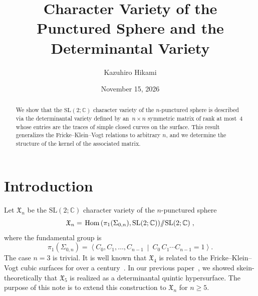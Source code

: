 \documentclass[12pt,reqno]{amsart}
\DeclareMathOperator{\Hom}{Hom}
\begin{document}
\title[]{Character Variety of the Punctured Sphere
  and
  the Determinantal Variety}
\author[]{Kazuhiro Hikami}
\address{Faculty of Mathematics,
  Kyushu University,
  Fukuoka 819-0395, Japan.}

\date{November 15, 2026}


\begin{abstract}
  We show that the $\mathrm{SL}(2;\mathbb{C})$ character variety of
  the $n$-punctured sphere is described via the determinantal variety
  defined by an~$n\times n$ symmetric  matrix of rank at most~$4$
  whose entries are the traces of simple
  closed curves on the surface.
  This result generalizes the Fricke--Klein--Vogt relations
  to arbitrary $n$, and we determine the structure of the
  kernel of the associated matrix.
\end{abstract}
\keywords{}
\subjclass[2000]{}
\maketitle



\section{Introduction}
Let $\mathfrak{X}_{n}$ be the $\mathrm{SL}(2;\mathbb{C})$
character variety of the $n$-punctured sphere
\begin{equation}
  \label{define-X_n}
  \mathfrak{X}_{n}=
  \left.
    \Hom\left(\pi_1(\Sigma_{0,n}), \mathrm{SL}(2;\mathbb{C})\right)
    \middle\slash\!\!\middle\slash
    \mathrm{SL}(2;\mathbb{C})
  \right. ,
\end{equation}
where the fundamental group is
\begin{equation}
  \label{define_pi1}
  \pi_1(\Sigma_{0,n})=
  \left\langle
    C_0, C_1, \dots, C_{n-1}
    ~\middle|~
    C_0 \, C_1 \cdots C_{n-1}=1
  \right\rangle.
\end{equation}
The case  $n=3$ is trivial.
It is well known that
$\mathfrak{X}_4$ is related to the Fricke--Klein--Vogt cubic surfaces
for over a century~\cite{FrickeKleinBook1897}.
In our previous paper~\cite{KHikami26a}, we showed skein-theoretically
that
$\mathfrak{X}_5$ is realized as a determinantal quintic hypersurface.
The purpose of this   note is to
extend this construction to
$\mathfrak{X}_n$ for  $n \geq 5$.
\end{document}
